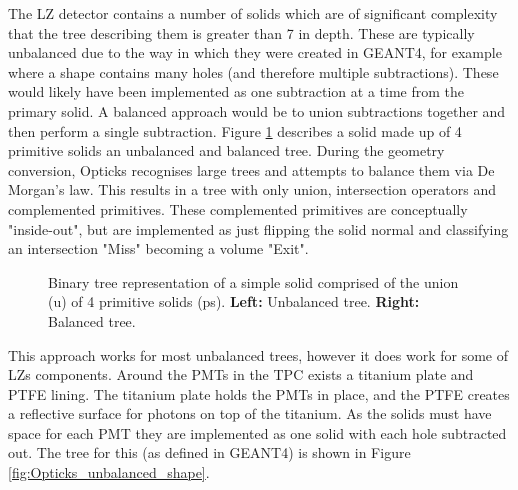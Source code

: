 \par
The LZ detector contains a number of solids which are of significant complexity that the tree describing them is greater than 7 in depth.
These are typically unbalanced due to the way in which they were created in GEANT4, for example where a shape contains many holes (and therefore multiple subtractions).
These would likely have been implemented as one subtraction at a time from the primary solid.
A balanced approach would be to union subtractions together and then perform a single subtraction.
Figure \ref{fig:UnionSolidBinaryTree} describes a solid made up of 4 primitive solids an unbalanced and balanced tree.
During the geometry conversion, Opticks recognises large trees and attempts to balance them via De Morgan's law.
This results in a tree with only union, intersection operators and complemented primitives.
These complemented primitives are conceptually "inside-out", but are implemented as just flipping the solid normal and classifying an intersection "Miss" becoming a volume "Exit".
\begin{figure}[!htpb]
\centering 
{}
\caption{Binary tree representation of a simple solid comprised of the union (u) of 4 primitive solids (ps). \textbf{Left:} Unbalanced tree. \textbf{Right:} Balanced tree.}
\label{fig:UnionSolidBinaryTree}
\end{figure}
\par
This approach works for most unbalanced trees, however it does work for some of LZs components.
Around the PMTs in the TPC exists a titanium plate and PTFE lining.
The titanium plate holds the PMTs in place, and the PTFE creates a reflective surface for photons on top of the titanium.
As the solids must have space for each PMT they are implemented as one solid with each hole subtracted out.
The tree for this (as defined in GEANT4) is shown in Figure \ref{fig:Opticks_unbalanced_shape}.
